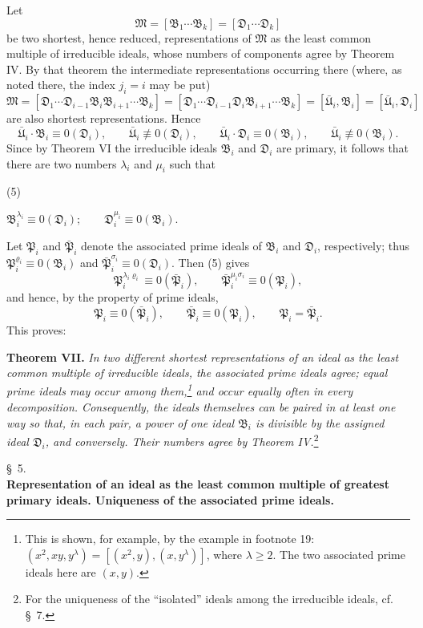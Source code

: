 \documentclass[11pt]{article}
\providecommand{\srcnumdisplay}[3][3.4em]{%
  \par\smallskip\noindent
  \begin{minipage}[t]{#1}\vspace*{0pt}#2\end{minipage}%
  \begin{minipage}[t]{\dimexpr\linewidth-#1\relax}\vspace*{0pt}\centering
  \(\displaystyle #3\)
  \end{minipage}\par\smallskip}
\providecommand{\ideal}[1]{\mathfrak{#1}}
\begin{document}
Let
\[
 \ideal M=[\ideal B_1\cdots\ideal B_k]=[\ideal D_1\cdots\ideal D_k]
\]
be two shortest, hence reduced, representations of $\ideal M$ as the least common multiple of irreducible ideals, whose numbers of components agree by Theorem IV. By that theorem the intermediate representations occurring there (where, as noted there, the index $j_i=i$ may be put)
\[
 \ideal M=[\ideal D_1\cdots\ideal D_{i-1}\ideal B_i\ideal B_{i+1}\cdots\ideal B_k]
       =[\ideal D_1\cdots\ideal D_{i-1}\ideal D_i\ideal B_{i+1}\cdots\ideal B_k]
       =[\bar{\ideal U}_i,\ideal B_i]=[\bar{\ideal U}_i,\ideal D_i]
\]
are also shortest representations. Hence
\[
 \bar{\ideal U}_i\cdot\ideal B_i\equiv0(\ideal D_i),\qquad \bar{\ideal U}_i\not\equiv0(\ideal D_i),
 \qquad
 \bar{\ideal U}_i\cdot\ideal D_i\equiv0(\ideal B_i),\qquad \bar{\ideal U}_i\not\equiv0(\ideal B_i).
\]
Since by Theorem VI the irreducible ideals $\ideal B_i$ and $\ideal D_i$ are primary, it follows that there are two numbers $\lambda_i$ and $\mu_i$ such that
\srcnumdisplay[3.1em]{(5)}{\ideal B_i^{\lambda_i}\equiv0(\ideal D_i);\qquad
 \ideal D_i^{\mu_i}\equiv0(\ideal B_i).}
Let $\ideal P_i$ and $\bar{\ideal P}_i$ denote the associated prime ideals of $\ideal B_i$ and $\ideal D_i$, respectively; thus $\ideal P_i^{\varrho_i}\equiv0(\ideal B_i)$ and $\bar{\ideal P}_i^{\sigma_i}\equiv0(\ideal D_i)$. Then (5) gives
\[
 \ideal P_i^{\lambda_i\varrho_i}\equiv0(\bar{\ideal P}_i),
 \qquad
 \bar{\ideal P}_i^{\mu_i\sigma_i}\equiv0(\ideal P_i),
\]
and hence, by the property of prime ideals,
\[
 \ideal P_i\equiv0(\bar{\ideal P}_i),
 \qquad
 \bar{\ideal P}_i\equiv0(\ideal P_i),
 \qquad
 \ideal P_i=\bar{\ideal P}_i.
\]
This proves:

\textbf{Theorem VII.} \emph{In two different shortest representations of an ideal as the least common multiple of irreducible ideals, the associated prime ideals agree; equal prime ideals may occur among them,\footnote{This is shown, for example, by the example in footnote 19: $(x^2,xy,y^\lambda)=[(x^2,y),(x,y^\lambda)]$, where $\lambda\ge2$. The two associated prime ideals here are $(x,y)$.} and occur equally often in every decomposition. Consequently, the ideals themselves can be paired in at least one way so that, in each pair, a power of one ideal $\ideal B_i$ is divisible by the assigned ideal $\ideal D_i$, and conversely. Their numbers agree by Theorem IV.}\footnote{For the uniqueness of the ``isolated'' ideals among the irreducible ideals, cf. \S~7.}

\begin{center}
\S~5.\\[0.25em]
\textbf{Representation of an ideal as the least common multiple of greatest primary ideals. Uniqueness of the associated prime ideals.}
\end{center}
\end{document}

